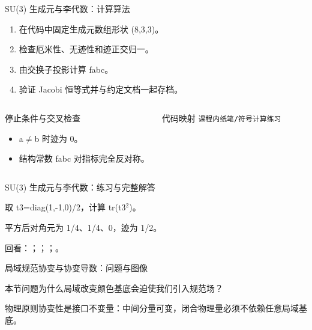 \begin{frame}[t]{SU(3) 生成元与李代数：计算算法}
\footnotesize
{}\begin{enumerate}
\item 在代码中固定生成元数组形状 (8,3,3)。
\item 检查厄米性、无迹性和迹正交归一。
\item 由交换子投影计算 fabc。
\item 验证 Jacobi 恒等式并与约定文档一起存档。
\end{enumerate}\begin{columns}[T,onlytextwidth]
\begin{block}{停止条件与交叉检查}\scriptsize\begin{itemize}
\item[\CheckMark] a\ensuremath{\ne}b 时迹为 0。
\item[\CheckMark] 结构常数 fabc 对指标完全反对称。
\end{itemize}\end{block}
\begin{block}{代码映射}
\scriptsize \texttt{课程内纸笔/\allowbreak{}符号计算练习}
\end{block}\end{columns}\end{frame}

\begin{frame}[t]{SU(3) 生成元与李代数：练习与完整解答}
\footnotesize
\begin{block}{}取 t3=diag(1,-1,0)/\allowbreak{}2，计算 tr(t3\ensuremath{^{2}})。\end{block}
\begin{exampleblock}{}平方后对角元为 1/\allowbreak{}4、1/\allowbreak{}4、0，迹为 1/\allowbreak{}2。\end{exampleblock}
\vfill
\scriptsize 回看：；；；。
\end{frame}

\begin{frame}[t]{局域规范协变与协变导数：问题与图像}
\footnotesize
\begin{block}{本节问题}为什么局域改变颜色基底会迫使我们引入规范场？\end{block}
\begin{block}{物理原则}\quad 协变性是接口不变量：中间分量可变，闭合物理量必须不依赖任意局域基底。\end{block}
\end{frame}

